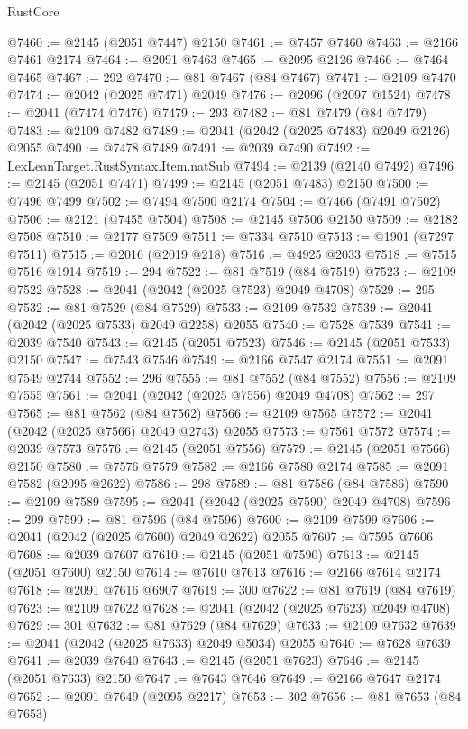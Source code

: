 \begin{lexlean}{RustCore}
\begin{coremodule}
@7460 := @2145 (@2051 @7447) @2150
@7461 := @7457 @7460
@7463 := @2166 @7461 @2174
@7464 := @2091 @7463
@7465 := @2095 @2126
@7466 := @7464 @7465
@7467 := 292
@7470 := @81 @7467 (@84 @7467)
@7471 := @2109 @7470
@7474 := @2042 (@2025 @7471) @2049
@7476 := @2096 (@2097 @1524)
@7478 := @2041 (@7474 @7476)
@7479 := 293
@7482 := @81 @7479 (@84 @7479)
@7483 := @2109 @7482
@7489 := @2041 (@2042 (@2025 @7483) @2049 @2126) @2055
@7490 := @7478 @7489
@7491 := @2039 @7490
@7492 := LexLeanTarget.RustSyntax.Item.natSub
@7494 := @2139 (@2140 @7492)
@7496 := @2145 (@2051 @7471)
@7499 := @2145 (@2051 @7483) @2150
@7500 := @7496 @7499
@7502 := @7494 @7500 @2174
@7504 := @7466 (@7491 @7502)
@7506 := @2121 (@7455 @7504)
@7508 := @2145 @7506 @2150
@7509 := @2182 @7508
@7510 := @2177 @7509
@7511 := @7334 @7510
@7513 := @1901 (@7297 @7511)
@7515 := @2016 (@2019 @218)
@7516 := @4925 @2033
@7518 := @7515 @7516 @1914
@7519 := 294
@7522 := @81 @7519 (@84 @7519)
@7523 := @2109 @7522
@7528 := @2041 (@2042 (@2025 @7523) @2049 @4708)
@7529 := 295
@7532 := @81 @7529 (@84 @7529)
@7533 := @2109 @7532
@7539 := @2041 (@2042 (@2025 @7533) @2049 @2258) @2055
@7540 := @7528 @7539
@7541 := @2039 @7540
@7543 := @2145 (@2051 @7523)
@7546 := @2145 (@2051 @7533) @2150
@7547 := @7543 @7546
@7549 := @2166 @7547 @2174
@7551 := @2091 @7549 @2744
@7552 := 296
@7555 := @81 @7552 (@84 @7552)
@7556 := @2109 @7555
@7561 := @2041 (@2042 (@2025 @7556) @2049 @4708)
@7562 := 297
@7565 := @81 @7562 (@84 @7562)
@7566 := @2109 @7565
@7572 := @2041 (@2042 (@2025 @7566) @2049 @2743) @2055
@7573 := @7561 @7572
@7574 := @2039 @7573
@7576 := @2145 (@2051 @7556)
@7579 := @2145 (@2051 @7566) @2150
@7580 := @7576 @7579
@7582 := @2166 @7580 @2174
@7585 := @2091 @7582 (@2095 @2622)
@7586 := 298
@7589 := @81 @7586 (@84 @7586)
@7590 := @2109 @7589
@7595 := @2041 (@2042 (@2025 @7590) @2049 @4708)
@7596 := 299
@7599 := @81 @7596 (@84 @7596)
@7600 := @2109 @7599
@7606 := @2041 (@2042 (@2025 @7600) @2049 @2622) @2055
@7607 := @7595 @7606
@7608 := @2039 @7607
@7610 := @2145 (@2051 @7590)
@7613 := @2145 (@2051 @7600) @2150
@7614 := @7610 @7613
@7616 := @2166 @7614 @2174
@7618 := @2091 @7616 @6907
@7619 := 300
@7622 := @81 @7619 (@84 @7619)
@7623 := @2109 @7622
@7628 := @2041 (@2042 (@2025 @7623) @2049 @4708)
@7629 := 301
@7632 := @81 @7629 (@84 @7629)
@7633 := @2109 @7632
@7639 := @2041 (@2042 (@2025 @7633) @2049 @5034) @2055
@7640 := @7628 @7639
@7641 := @2039 @7640
@7643 := @2145 (@2051 @7623)
@7646 := @2145 (@2051 @7633) @2150
@7647 := @7643 @7646
@7649 := @2166 @7647 @2174
@7652 := @2091 @7649 (@2095 @2217)
@7653 := 302
@7656 := @81 @7653 (@84 @7653)

\end{coremodule}
\end{lexlean}
